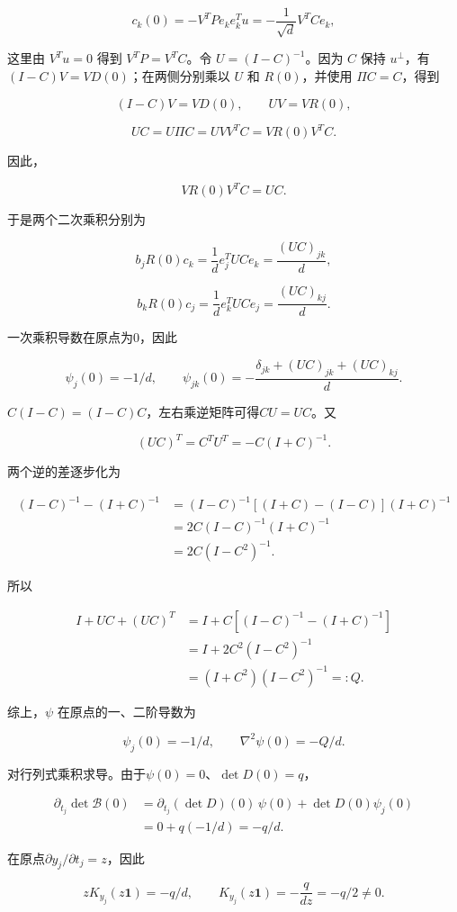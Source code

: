 \documentclass[11pt,a4paper]{article}
\providecommand{\mathscr}[1]{\mathcal{#1}}
\begin{document}
\[c_k(0)=-V^TPe_ke_k^Tu
=-\frac1{\sqrt d}V^TCe_k,\]

这里由 \(V^Tu=0\) 得到 \(V^TP=V^TC\)。令 \(U=(I-C)^{-1}\)。因为 \(C\) 保持 \(u^\perp\)，有 \((I-C)V=VD(0)\)；在两侧分别乘以 \(U\) 和 \(R(0)\)，并使用 \(\Pi C=C\)，得到

\[(I-C)V=VD(0),\qquad UV=VR(0),\]

\[UC=U\Pi C=UVV^TC=VR(0)V^TC.\]

因此，

\[VR(0)V^TC=UC.\]

于是两个二次乘积分别为

\[b_jR(0)c_k=\frac1d e_j^TUC e_k=\frac{(UC)_{jk}}d,\]

\[b_kR(0)c_j=\frac1d e_k^TUC e_j=\frac{(UC)_{kj}}d.\]

一次乘积导数在原点为0，因此

\[\psi_j(0)=-1/d,\qquad
\psi_{jk}(0)=-\frac{\delta_{jk}+(UC)_{jk}+(UC)_{kj}}d.\]

\(C(I-C)=(I-C)C\)，左右乘逆矩阵可得\(CU=UC\)。又

\[(UC)^T=C^TU^T=-C(I+C)^{-1}.\]

两个逆的差逐步化为

\[\begin{aligned}
(I-C)^{-1}-(I+C)^{-1}
&=(I-C)^{-1}[(I+C)-(I-C)](I+C)^{-1}\\
&=2C(I-C)^{-1}(I+C)^{-1}\\
&=2C(I-C^2)^{-1}.
\end{aligned}\]

所以

\[\begin{aligned}
I+UC+(UC)^T
&=I+C[(I-C)^{-1}-(I+C)^{-1}]\\
&=I+2C^2(I-C^2)^{-1}\\
&=(I+C^2)(I-C^2)^{-1}=:Q.
\end{aligned}\]

综上，\(\psi\) 在原点的一、二阶导数为

\[{\psi_j(0)=-1/d,\qquad
\nabla^2\psi(0)=-Q/d.}\]

对行列式乘积求导。由于\(\psi(0)=0\)、\(\det D(0)=q\)，

\[\begin{aligned}
\partial_{t_j}\det\mathscr B(0)
&=\partial_{t_j}(\det D)(0)\,\psi(0)+\det D(0)\psi_j(0)\\
&=0+q(-1/d)=-q/d.
\end{aligned}\]

在原点\(\partial y_j/\partial t_j=z\)，因此

\[zK_{y_j}(z\mathbf1)=-q/d,\qquad
K_{y_j}(z\mathbf1)=-\frac{q}{dz}=-q/2\ne0.\]
\end{document}
